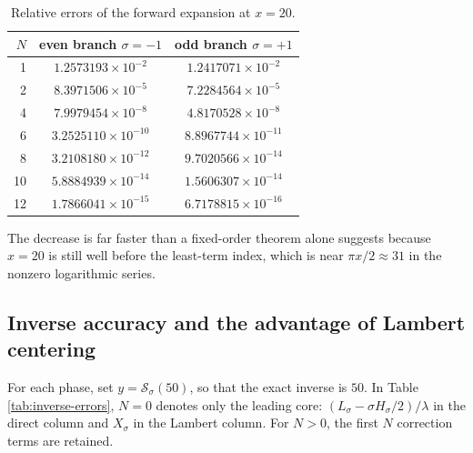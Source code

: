 \documentclass[11pt,a4paper]{article}
\numberwithin{equation}{section}
\theoremstyle{definition}
\theoremstyle{remark}
\begin{document}
\begin{table}[htbp]
\centering
\caption{Relative errors of the forward expansion at \(x=20\).}
\label{tab:forward-errors}
\begin{tabular}{rcc}
\toprule
\(N\)&even branch \(\sigma=-1\)&odd branch \(\sigma=+1\)\\
\midrule
1  &\(1.2573193\times10^{-2}\)&\(1.2417071\times10^{-2}\)\\
2  &\(8.3971506\times10^{-5}\)&\(7.2284564\times10^{-5}\)\\
4  &\(7.9979454\times10^{-8}\)&\(4.8170528\times10^{-8}\)\\
6  &\(3.2525110\times10^{-10}\)&\(8.8967744\times10^{-11}\)\\
8  &\(3.2108180\times10^{-12}\)&\(9.7020566\times10^{-14}\)\\
10 &\(5.8884939\times10^{-14}\)&\(1.5606307\times10^{-14}\)\\
12 &\(1.7866041\times10^{-15}\)&\(6.7178815\times10^{-16}\)\\
\bottomrule
\end{tabular}
\end{table}

The decrease is far faster than a fixed-order theorem alone suggests because
\(x=20\) is still well before the least-term index, which is near
\(\pi x/2\approx31\) in the nonzero logarithmic series.

\subsection{Inverse accuracy and the advantage of Lambert centering}

For each phase, set \(y=\mathcal S_\sigma(50)\), so that the exact inverse is
\(50\).  In Table \ref{tab:inverse-errors}, \(N=0\) denotes only the leading
core: \((L_\sigma-\sigma H_\sigma/2)/\lambda\) in the direct column and
\(X_\sigma\) in the Lambert column.  For \(N>0\), the first \(N\) correction
terms are retained.
\end{document}
